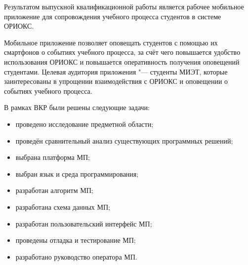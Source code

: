 \Conclusion %

Результатом выпускной квалификационной работы является рабочее мобильное приложение для сопровождения учебного процесса студентов в системе ОРИОКС.

Мобильное приложение позволяет оповещать студентов с помощью их смартфонов о событиях учебного процесса, за счёт чего повышается удобство использования ОРИОКС и повышается оперативность получения оповещений студентами.
Целевая аудитория приложения "--- студенты МИЭТ, которые заинтересованы в упрощении взаимодействия с ОРИОКС и оповещении о событиях учебного процесса.

В рамках ВКР были решены следующие задачи:
\begin{itemize}
  \item проведено исследование предметной области;
  \item проведён сравнительный анализ существующих программных решений;
  \item выбрана платформа МП;
  \item выбран язык и среда программирования;
  \item разработан алгоритм МП;
  \item разработана схема данных МП;
  \item разработан пользовательский интерфейс МП;
  \item проведены отладка и тестирование МП;
  \item разработано руководство оператора МП.
\end{itemize}

